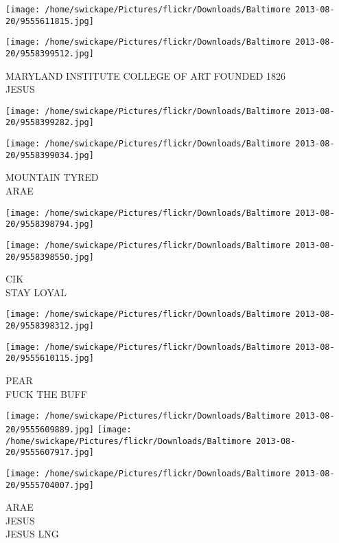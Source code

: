 \documentclass[10pt,letterpaper]{article}
\begin{document}
\texttt{[image: /home/swickape/Pictures/flickr/Downloads/Baltimore 2013-08-20/9555611815.jpg]}

\vspace{0.25in}
\texttt{[image: /home/swickape/Pictures/flickr/Downloads/Baltimore 2013-08-20/9558399512.jpg]}

MARYLAND INSTITUTE COLLEGE OF ART FOUNDED 1826\\
JESUS\\
\pagebreak

\texttt{[image: /home/swickape/Pictures/flickr/Downloads/Baltimore 2013-08-20/9558399282.jpg]}

\vspace{0.25in}
\texttt{[image: /home/swickape/Pictures/flickr/Downloads/Baltimore 2013-08-20/9558399034.jpg]}

MOUNTAIN TYRED\\
ARAE\\
\pagebreak

\texttt{[image: /home/swickape/Pictures/flickr/Downloads/Baltimore 2013-08-20/9558398794.jpg]}

\vspace{0.25in}
\texttt{[image: /home/swickape/Pictures/flickr/Downloads/Baltimore 2013-08-20/9558398550.jpg]}

CIK\\
STAY LOYAL\\
\pagebreak

\texttt{[image: /home/swickape/Pictures/flickr/Downloads/Baltimore 2013-08-20/9558398312.jpg]}

\vspace{0.25in}
\texttt{[image: /home/swickape/Pictures/flickr/Downloads/Baltimore 2013-08-20/9555610115.jpg]}

PEAR\\
FUCK THE BUFF\\
\pagebreak

\texttt{[image: /home/swickape/Pictures/flickr/Downloads/Baltimore 2013-08-20/9555609889.jpg]}
\texttt{[image: /home/swickape/Pictures/flickr/Downloads/Baltimore 2013-08-20/9555607917.jpg]}

\texttt{[image: /home/swickape/Pictures/flickr/Downloads/Baltimore 2013-08-20/9555704007.jpg]}

ARAE\\
JESUS\\
JESUS LNG\\
\pagebreak
\end{document}
